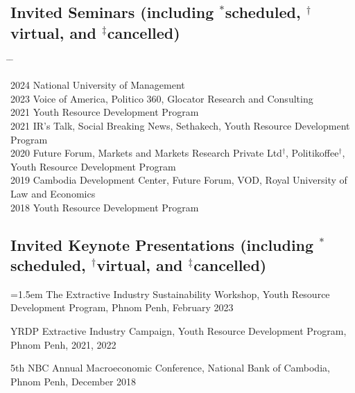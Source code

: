 \documentclass[10pt,a4paper]{article}
\newcommand{\tabbedblock}[1]{

	\begin{tabbing}
		\hspace{2cm} \= \hspace{4cm} \= \kill
		#1
	\end{tabbing}
}
\begin{document}
\subsection*{Invited Seminars (including $^\ast$scheduled, $^\dag$virtual, and $^\ddag$cancelled)}

\tabbedblock{
	2024 \> National University of Management\\ 
	
	2023 \> Voice of America, Politico 360, Glocator Research and Consulting \\
		
	2021  \>  Youth Resource Development Program \\
	
	
	2021  \>  IR’s Talk, Social Breaking News, Sethakech, Youth Resource Development Program \\
	
	2020 \>  Future Forum, Markets and Markets Research Private Ltd$^\dag$, Politikoffee$^\dag$, \\
	\> Youth Resource Development Program \\
	
	2019 \> Cambodia Development Center, Future Forum, VOD, Royal University of Law and Economics \\
	
	2018 \> Youth Resource Development Program
}
	
	
\subsection*{Invited Keynote Presentations (including $^\ast$scheduled, $^\dag$virtual, and $^\ddag$cancelled)}

\hangindent=1.5em
The Extractive Industry Sustainability Workshop, Youth Resource Development Program, Phnom Penh, February 2023

YRDP Extractive Industry Campaign, Youth Resource Development Program, Phnom Penh, 2021, 2022

5th NBC Annual Macroeconomic Conference, National Bank of Cambodia, Phnom Penh, December 2018


\end{document}

